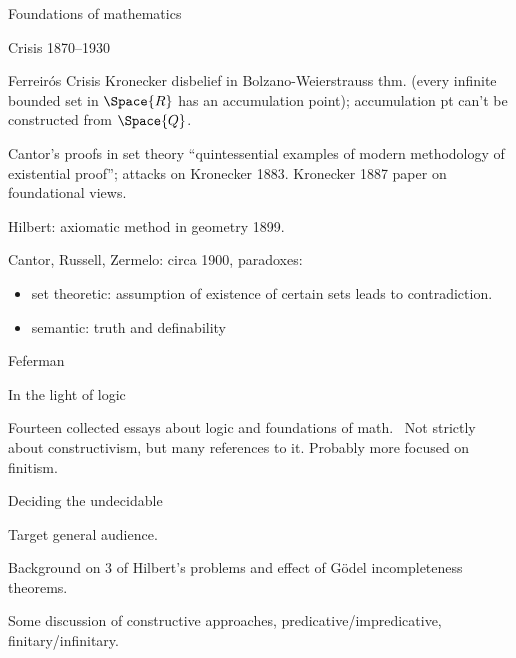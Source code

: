 \begin{plSection}{Foundations of mathematics}
\begin{plSection}{Crisis 1870--1930}
\begin{plSection}{Ferreir\'{o}s Crisis}
Kronecker disbelief in Bolzano-Weierstrauss thm.
(every infinite bounded set in $\Space{R}$ 
has an accumulation point);
accumulation pt can't be constructed from $\Space{Q}$.

Cantor's proofs in set theory ``quintessential examples
of modern methodology of existential proof''; 
attacks on Kronecker 1883.
Kronecker 1887 paper on foundational views.

Hilbert: axiomatic method in geometry 1899.

Cantor, Russell, Zermelo: circa 1900, paradoxes:
\begin{itemize}
  \item set theoretic: assumption of existence of certain sets
  leads to contradiction.
  \item semantic: truth and definability
\end{itemize}

\end{plSection}%
\end{plSection}%
\begin{plSection}{Feferman}
\label{sec:Feferman}

\begin{plSection}{In the light of logic}
\label{sec:In_the_light_of_logic}

Fourteen collected essays about logic and foundations of 
math.~\cite{Feferman:1998:LightOfLogic}
Not strictly about constructivism, but many references to it.
Probably more focused on finitism.

\begin{plSection}{Deciding the undecidable}
\label{sec:Deciding_the_undecidable}

\cite[ch.~1 ``Deciding the undecidable'']{Feferman:1998:LightOfLogic}

Target general audience.

Background on $3$ of Hilbert's problems
and effect of G\"{o}del incompleteness theorems.

Some discussion of constructive approaches, 
predicative/impredicative, finitary/infinitary.


\end{plSection}
\end{plSection}
\end{plSection}
\end{plSection}

